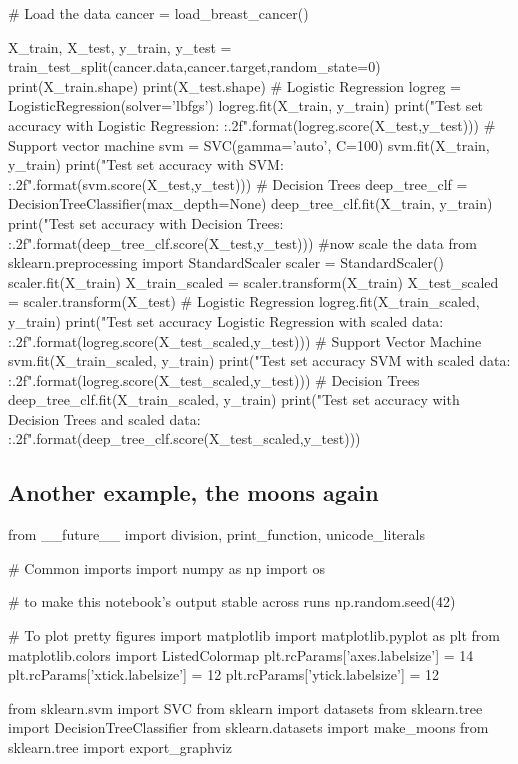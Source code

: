 \documentclass[%
oneside,                 %
final,                   %
10pt]{article}
\begin{document}
# Load the data
cancer = load_breast_cancer()

X_train, X_test, y_train, y_test = train_test_split(cancer.data,cancer.target,random_state=0)
print(X_train.shape)
print(X_test.shape)
# Logistic Regression
logreg = LogisticRegression(solver='lbfgs')
logreg.fit(X_train, y_train)
print("Test set accuracy with Logistic Regression: {:.2f}".format(logreg.score(X_test,y_test)))
# Support vector machine
svm = SVC(gamma='auto', C=100)
svm.fit(X_train, y_train)
print("Test set accuracy with SVM: {:.2f}".format(svm.score(X_test,y_test)))
# Decision Trees
deep_tree_clf = DecisionTreeClassifier(max_depth=None)
deep_tree_clf.fit(X_train, y_train)
print("Test set accuracy with Decision Trees: {:.2f}".format(deep_tree_clf.score(X_test,y_test)))
#now scale the data
from sklearn.preprocessing import StandardScaler
scaler = StandardScaler()
scaler.fit(X_train)
X_train_scaled = scaler.transform(X_train)
X_test_scaled = scaler.transform(X_test)
# Logistic Regression
logreg.fit(X_train_scaled, y_train)
print("Test set accuracy Logistic Regression with scaled data: {:.2f}".format(logreg.score(X_test_scaled,y_test)))
# Support Vector Machine
svm.fit(X_train_scaled, y_train)
print("Test set accuracy SVM with scaled data: {:.2f}".format(logreg.score(X_test_scaled,y_test)))
# Decision Trees
deep_tree_clf.fit(X_train_scaled, y_train)
print("Test set accuracy with Decision Trees and scaled data: {:.2f}".format(deep_tree_clf.score(X_test_scaled,y_test)))

\epycod


\subsection{Another example, the moons again}
\bpycod
from __future__ import division, print_function, unicode_literals

# Common imports
import numpy as np
import os

# to make this notebook's output stable across runs
np.random.seed(42)

# To plot pretty figures
import matplotlib
import matplotlib.pyplot as plt
from matplotlib.colors import ListedColormap
plt.rcParams['axes.labelsize'] = 14
plt.rcParams['xtick.labelsize'] = 12
plt.rcParams['ytick.labelsize'] = 12


from sklearn.svm import SVC
from sklearn import datasets
from sklearn.tree import DecisionTreeClassifier
from sklearn.datasets import make_moons
from sklearn.tree import export_graphviz
\end{document}

